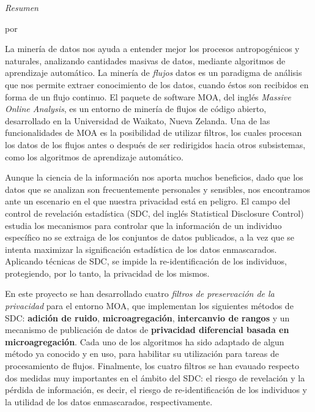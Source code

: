 \clearpage %

\thispagestyle{plain}
\null\vfil
\begin{center}
	\setlength{\parskip}{0pt}
	{\huge{\textit{Resumen}} \par}
	\bigskip
	{\Large\bf \ttitle \par} %
	\medskip
	{\normalsize por \authornames \par} %
\end{center}

La minería de datos nos ayuda a entender mejor los procesos antropogénicos y naturales, analizando cantidades masivas de datos, mediante algoritmos de aprendizaje automático. La minería de \textit{flujos} datos es un paradigma de análisis que nos permite extraer conocimiento de los datos, cuando éstos son recibidos en forma de un flujo continuo. El paquete de software MOA, del inglés \textit{Massive Online Analysis}, es un entorno de minería de flujos de código abierto, desarrollado en la Universidad de Waikato, Nueva Zelanda. Una de las funcionalidades de MOA es la posibilidad de utilizar filtros, los cuales procesan los datos de los flujos antes o después de ser redirigidos hacia otros subsistemas, como los algoritmos de aprendizaje automático.

Aunque la ciencia de la información nos aporta muchos beneficios, dado que los datos que se analizan son frecuentemente personales y sensibles, nos encontramos ante un escenario en el que nuestra privacidad está en peligro. El campo del control de revelación estadística (SDC, del inglés {Statistical Disclosure Control}) estudia los mecanismos para controlar que la información de un individuo específico no se extraiga de los conjuntos de datos publicados, a la vez que se intenta maximizar la significación estadística de los datos enmascarados. Aplicando técnicas de SDC, se impide la re-identificación de los individuos, protegiendo, por lo tanto, la privacidad de los mismos.

En este proyecto se han desarrollado cuatro \textit{filtros de preservación de la privacidad} para el entorno MOA, que implementan los siguientes métodos de SDC: \textbf{adición de ruido}, \textbf{microagregación}, \textbf{intercanvio de rangos} y un mecanismo de publicación de datos de \textbf{privacidad diferencial basada en microagregación}. Cada uno de los algoritmos ha sido adaptado de algun método ya conocido y en uso, para habilitar su utilización para tareas de procesamiento de flujos. Finalmente, los cuatro filtros se han evauado respecto dos medidas muy importantes en el ámbito del SDC: el riesgo de revelación y la pérdida de información, es decir, el riesgo de re-identificación de los individuos y la utilidad de los datos enmascarados, respectivamente.

\clearpage %